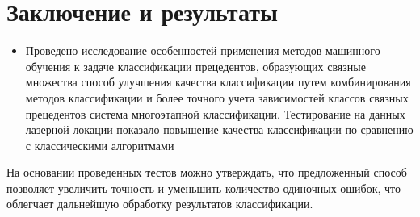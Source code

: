 \newpage
\section{Заключение и результаты}


\begin{itemize}
  \item Проведено исследование особенностей применения методов машинного обучения к задаче классификации прецедентов, образующих связные множества
   способ улучшения качества классификации путем  комбинирования методов классификации и более точного учета зависимостей классов связных прецедентов
   система многоэтапной классификации. Тестирование на данных лазерной локации показало повышение качества классификации по сравнению с классическими алгоритмами
\end{itemize}

На основании проведенных тестов можно утверждать, что предложенный способ позволяет увеличить точность и уменьшить количество одиночных ошибок, что облегчает дальнейшую обработку результатов классификации.